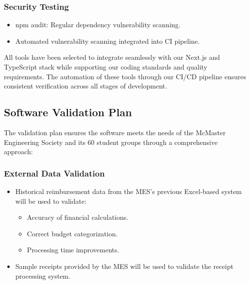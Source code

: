 \documentclass[12pt, titlepage]{article}
\begin{document}
\subsubsection*{Security Testing}
\begin{itemize}
    \item npm audit: Regular dependency vulnerability scanning.
    \item Automated vulnerability scanning integrated into CI pipeline.
\end{itemize}

All tools have been selected to integrate seamlessly with our Next.js and TypeScript stack while supporting our coding standards and quality requirements. The automation of these tools through our CI/CD pipeline ensures consistent verification across all stages of development.

\subsection{Software Validation Plan}
The validation plan ensures the software meets the needs of the McMaster Engineering Society and its 60 student groups through a comprehensive approach:
\subsubsection*{External Data Validation}
\begin{itemize}
   \item Historical reimbursement data from the MES's previous Excel-based system will be used to validate:
   \begin{itemize}
       \item Accuracy of financial calculations.
       \item Correct budget categorization.
       \item Processing time improvements.
   \end{itemize}
   \item Sample receipts provided by the MES will be used to validate the receipt processing system.
\end{itemize}
\end{document}
